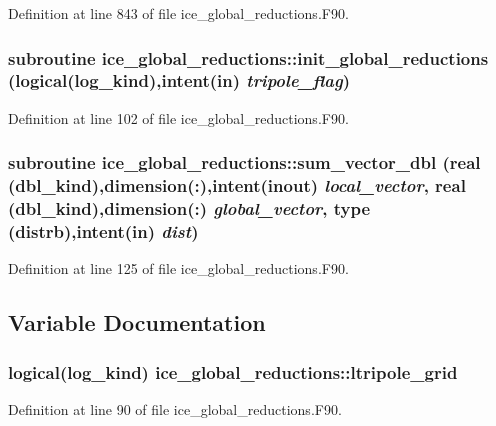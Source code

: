 Definition at line 843 of file ice\_\-global\_\-reductions.F90.\hypertarget{namespaceice__global__reductions_ab9fb73d7096dbb733f5878483a696cf1}{
\subsubsection[{init\_\-global\_\-reductions}]{\setlength{\rightskip}{0pt plus 5cm}subroutine ice\_\-global\_\-reductions::init\_\-global\_\-reductions (logical(log\_\-kind),intent(in) {\em tripole\_\-flag})}}
\label{namespaceice__global__reductions_ab9fb73d7096dbb733f5878483a696cf1}


Definition at line 102 of file ice\_\-global\_\-reductions.F90.\hypertarget{namespaceice__global__reductions_adeb296e7d016ecf60a1c72d19d04a868}{
\subsubsection[{sum\_\-vector\_\-dbl}]{\setlength{\rightskip}{0pt plus 5cm}subroutine ice\_\-global\_\-reductions::sum\_\-vector\_\-dbl (real (dbl\_\-kind),dimension(:),intent(inout) {\em local\_\-vector}, \/  real (dbl\_\-kind),dimension(:) {\em global\_\-vector}, \/  type (distrb),intent(in) {\em dist})}}
\label{namespaceice__global__reductions_adeb296e7d016ecf60a1c72d19d04a868}


Definition at line 125 of file ice\_\-global\_\-reductions.F90.

\subsection{Variable Documentation}
\hypertarget{namespaceice__global__reductions_a14140465b78c72f3b6923a37f4b8ea4c}{
\subsubsection[{ltripole\_\-grid}]{\setlength{\rightskip}{0pt plus 5cm}logical(log\_\-kind) {\bf ice\_\-global\_\-reductions::ltripole\_\-grid}}}
\label{namespaceice__global__reductions_a14140465b78c72f3b6923a37f4b8ea4c}


Definition at line 90 of file ice\_\-global\_\-reductions.F90.